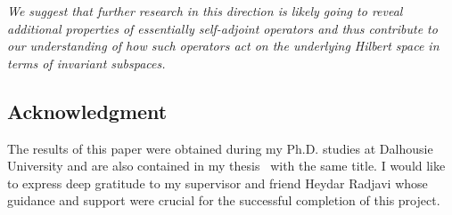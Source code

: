 \documentclass{tran-l}
\theoremstyle{definition}
\theoremstyle{remark}
\numberwithin{equation}{subsection}
\begin{document}
\emph{We suggest that further research in this direction is likely going to reveal additional properties of essentially self-adjoint operators and thus contribute to our understanding of how such operators act on the underlying Hilbert space in terms of invariant subspaces.}

\subsection*{Acknowledgment}
The results of this paper were obtained during my Ph.D. studies at Dalhousie University and are also contained in my thesis~\cite{Sim94} with the same title. I would like to express deep gratitude to my supervisor and friend Heydar Radjavi whose guidance and support were crucial for the successful completion of this project.




\end{document}
